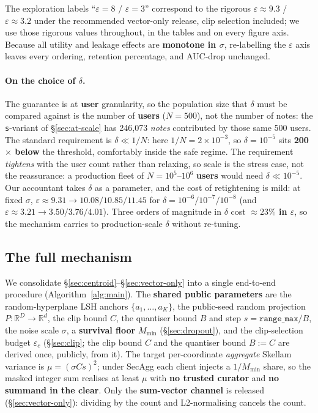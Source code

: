 \documentclass[pdflatex,sn-mathphys-num,12pt]{sn-jnl}
\theoremstyle{thmstyleone}%
\theoremstyle{thmstyletwo}%
\theoremstyle{thmstylethree}%
\newcommand{\eps}{\varepsilon}
\newcommand{\R}{\mathbb{R}}
\newcommand{\secref}[1]{\S\ref{#1}}
\begin{document}
The exploration labels ``$\eps = 8$ / $\eps = 3$'' correspond to the rigorous
$\eps \approx 9.3$ / $\eps \approx 3.2$ under the recommended vector-only release,
clip selection included; we use those rigorous values throughout, in the tables and on
every figure axis. Because all utility and leakage effects are \textbf{monotone in
$\sigma$}, re-labelling the $\eps$ axis leaves every ordering, retention percentage,
and AUC-drop unchanged.

\paragraph{On the choice of $\delta$.} The guarantee is at \textbf{user} granularity,
so the population size that $\delta$ must be compared against is the number of
\textbf{users} ($N = 500$), not the number of notes: the \texttt{s}-variant of
\secref{sec:at-scale} has 246{,}073 \emph{notes} contributed by those same 500 users.
The standard requirement is $\delta \ll 1/N$: here $1/N = 2 \times 10^{-3}$, so
$\delta = 10^{-5}$ sits \textbf{200$\times$ below} the threshold, comfortably inside
the safe regime. The requirement \emph{tightens} with the user count rather than
relaxing, so scale is the stress case, not the reassurance: a production fleet of
$N = 10^{5}$--$10^{6}$ \textbf{users} would need $\delta \ll 10^{-5}$. Our accountant
takes $\delta$ as a parameter, and the cost of retightening is mild: at fixed
$\sigma$, $\eps \approx 9.31 \to 10.08 / 10.85 / 11.45$ for
$\delta = 10^{-6} / 10^{-7} / 10^{-8}$ (and $\eps \approx 3.21 \to 3.50 / 3.76 / 4.01$).
Three orders of magnitude in $\delta$ cost \textbf{${\approx}23\%$ in $\eps$}, so the
mechanism carries to production-scale $\delta$ without re-tuning.

\subsection{The full mechanism}\label{sec:algorithm}

We consolidate \secref{sec:centroid}--\secref{sec:vector-only} into a single
end-to-end procedure (Algorithm~\ref{alg:main}). The \textbf{shared public parameters}
are the random-hyperplane LSH anchors $\{a_1, \dots, a_K\}$, the public-seed random
projection $P : \R^{D} \to \R^{d}$, the clip bound $C$, the quantiser bound $B$ and
step $s = \texttt{range\_max}/B$, the noise scale $\sigma$, a \textbf{survival floor}
$M_{\min}$ (\secref{sec:dropout}), and the clip-selection budget $\eps_c$
(\secref{sec:clip}; the clip bound $C$ and the quantiser bound $B := C$ are derived
once, publicly, from it). The target per-coordinate \emph{aggregate} Skellam variance
is $\mu = (\sigma C s)^2$; under SecAgg each client injects a $1/M_{\min}$ share, so
the masked integer sum realises at least $\mu$ with \textbf{no trusted curator} and
\textbf{no summand in the clear}. Only the \textbf{sum-vector channel} is released
(\secref{sec:vector-only}): dividing by the count and L2-normalising cancels the count.
\end{document}

